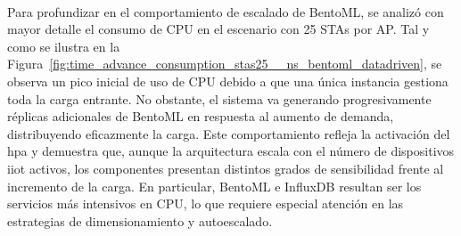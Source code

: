 \\
Para profundizar en el comportamiento de escalado de BentoML, se analizó con mayor detalle el consumo de CPU en el escenario con 25 STAs por AP. Tal y como se ilustra en la Figura~\ref{fig:time_advance_consumption_stas25__ns_bentoml_datadriven}, se observa un pico inicial de uso de CPU debido a que una única instancia gestiona toda la carga entrante. No obstante, el sistema va generando progresivamente réplicas adicionales de BentoML en respuesta al aumento de demanda, distribuyendo eficazmente la carga. Este comportamiento refleja la activación del \gls{hpa} y demuestra que, aunque la arquitectura escala con el número de dispositivos \gls{iiot} activos, los componentes presentan distintos grados de sensibilidad frente al incremento de la carga. En particular, BentoML e InfluxDB resultan ser los servicios más intensivos en CPU, lo que requiere especial atención en las estrategias de dimensionamiento y autoescalado.

